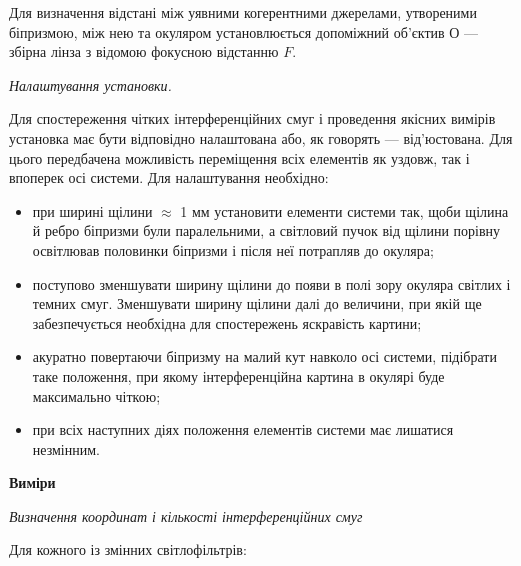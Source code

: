 \documentclass[12pt,a4paper]{article}
\begin{document}
    Для визначення відстані між уявними когерентними джерелами, утвореними біпризмою,
    між нею та окуляром установлюється допоміжний об’єктив О --- збірна лінза з відомою
    фокусною відстанню $F$.

    \begin{center} \textit{Налаштування установки.} \end{center}

    Для спостереження чітких інтерференційних смуг і проведення якісних вимірів
    установка має бути відповідно налаштована або, як говорять --- від'юстована.
    Для цього передбачена можливість переміщення всіх елементів як уздовж, так
    і впоперек осі системи. Для налаштування необхідно:

    \begin{itemize}

        \item при ширині щілини $\approx$ 1 мм установити елементи системи так, щоби щілина й
        ребро біпризми були паралельними, а світловий пучок від щілини порівну освітлював
        половинки біпризми і після неї потрапляв до окуляра;

        \item поступово зменшувати ширину щілини до появи в полі зору окуляра світлих і
        темних смуг. Зменшувати ширину щілини далі до величини,
        при якій ще забезпечується необхідна для спостережень яскравість картини;

        \item акуратно повертаючи біпризму на малий кут навколо осі системи,
        підібрати таке положення, при якому інтерференційна картина в окулярі буде
        максимально чіткою;

        \item при всіх наступних діях положення елементів системи має лишатися незмінним.
    
    \end{itemize}

    \begin{center} \textbf{Виміри} \end{center}

    \begin{center} \textit{Визначення координат і кількості інтерференційних смуг} \end{center}

    Для кожного із змінних світлофільтрів:
\end{document}
